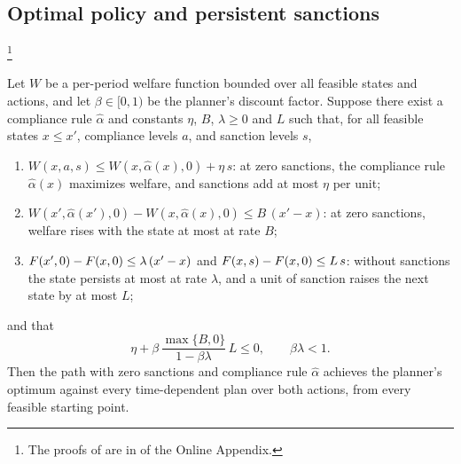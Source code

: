 \subsection{Optimal policy and persistent sanctions}
\label{sec:welfare:efficiency}
\label{sec:welfare:costly}

\footnote{The proofs of
 are in
 of the Online Appendix.}

\begin{proposition}
\label{prop:zero-sanction-planner}
Let $W$ be a per-period welfare function bounded over all feasible states and actions,
and let $\beta\in[0,1)$ be the planner's discount factor. Suppose there exist a
compliance rule $\hat\alpha$ and constants $\eta$, $B$, $\lambda\ge0$ and $L$ such that,
for all feasible states $x\le x'$, compliance levels $a$, and sanction levels $s$,
\begin{enumerate}[label=(\roman*)]
\item $W(x,a,s)\le W(x,\hat\alpha(x),0)+\eta\,s$: at zero sanctions, the compliance rule
$\hat\alpha(x)$ maximizes welfare, and sanctions add at most $\eta$ per unit;
\item $W(x',\hat\alpha(x'),0)-W(x,\hat\alpha(x),0)\le B\,(x'-x)$: at zero sanctions,
welfare rises with the state at most at rate $B$;
\item $F(x',0)-F(x,0)\le\lambda\,(x'-x)$ and $F(x,s)-F(x,0)\le L\,s$: without
sanctions the state persists at most at rate $\lambda$, and a unit of sanction raises the
next state by at most $L$;
\end{enumerate}
and that
\[
\eta+\beta\,\frac{\max\{B,0\}}{1-\beta\lambda}\,L\le0,\qquad \beta\lambda<1 .
\]
Then the path with zero sanctions and compliance rule $\hat\alpha$ achieves the
planner's optimum against every time-dependent plan over both actions, from every
feasible starting point.
\end{proposition}

